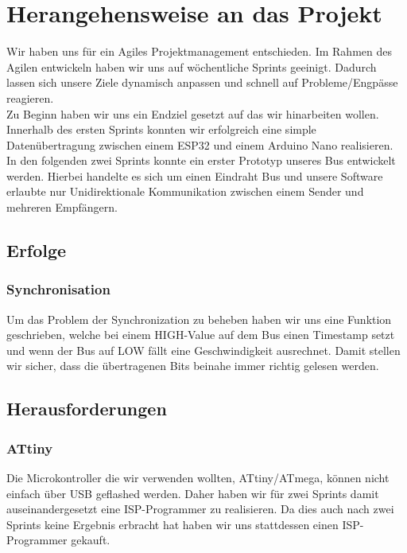 \section{Herangehensweise an das Projekt}


Wir haben uns für ein Agiles Projektmanagement entschieden. Im Rahmen des Agilen entwickeln haben wir uns auf wöchentliche Sprints geeinigt. Dadurch lassen sich unsere Ziele dynamisch anpassen und schnell auf Probleme/Engpässe reagieren.\\

Zu Beginn haben wir uns ein Endziel gesetzt auf das wir hinarbeiten wollen. Innerhalb des ersten Sprints konnten wir erfolgreich eine simple Datenübertragung zwischen einem ESP32 und einem Arduino Nano realisieren. \\

In den folgenden zwei Sprints konnte ein erster Prototyp unseres Bus entwickelt werden. Hierbei handelte es sich um einen Eindraht Bus und unsere Software erlaubte nur Unidirektionale Kommunikation zwischen einem Sender und mehreren Empfängern.

\subsection{Erfolge}
\subsubsection{Synchronisation}
Um das Problem der Synchronization zu beheben haben wir uns eine Funktion geschrieben, welche bei einem HIGH-Value auf dem Bus einen Timestamp setzt und wenn der Bus auf LOW fällt eine Geschwindigkeit ausrechnet. Damit stellen wir sicher, dass die übertragenen Bits beinahe immer richtig gelesen werden.

\subsection{Herausforderungen}
\subsubsection{ATtiny}
Die Microkontroller die wir verwenden wollten, ATtiny/ATmega, können nicht einfach über USB geflashed werden. Daher haben wir für zwei Sprints damit auseinandergesetzt eine ISP-Programmer zu realisieren. Da dies auch nach zwei Sprints keine Ergebnis erbracht hat haben wir uns stattdessen einen ISP-Programmer gekauft.

